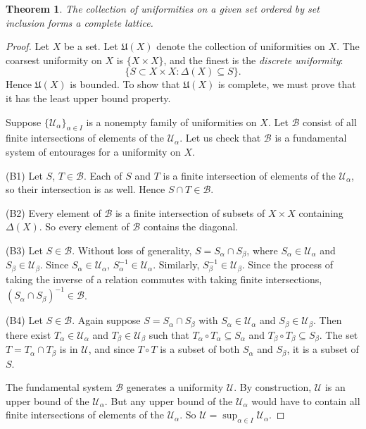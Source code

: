 \documentclass[12pt]{article}
\newtheorem*{theorem*}{Theorem}
\newcommand{\UU}{\mathcal{U}}
\newcommand{\BB}{\mathcal{B}}
\begin{document}
\begin{theorem*}
The collection of uniformities on a given set ordered by set inclusion forms a complete lattice.
\end{theorem*}

\begin{proof}
Let $X$ be a set.  Let $\mathfrak{U}(X)$ denote the collection of uniformities on $X$.  The coarsest uniformity on $X$ is $\{X\times X\}$, and the finest is the \emph{discrete uniformity}:
\[
\{S\subset X\times X\colon \Delta(X)\subseteq S\}.
\]
Hence $\mathfrak{U}(X)$ is bounded.  To show that $\mathfrak{U}(X)$ is complete, we must prove that it has the least upper bound property.  

Suppose $\{\UU_{\alpha}\}_{\alpha\in I}$ is a nonempty family of uniformities on $X$.  Let $\BB$ consist of all finite intersections of elements of the $\UU_{\alpha}$.  Let us check that $\BB$ is a fundamental system of entourages for a uniformity on $X$.

(B1) Let $S$, $T\in\BB$.  Each of $S$ and $T$ is a finite intersection of elements of the $\UU_{\alpha}$, so their intersection is as well.  Hence $S\cap T\in\BB$.

(B2) Every element of $\BB$ is a finite intersection of subsets of $X\times X$ containing $\Delta(X)$.  So every element of $\BB$ contains the diagonal.

(B3) Let $S\in\BB$.  Without loss of generality, $S=S_{\alpha}\cap S_{\beta}$, where $S_{\alpha}\in\UU_{\alpha}$ and $S_{\beta}\in\UU_{\beta}$.  Since $S_{\alpha}\in\UU_{\alpha}$, $S_{\alpha}^{-1}\in\UU_{\alpha}$.  Similarly, $S_{\beta}^{-1}\in\UU_{\beta}$.  Since the process of taking the inverse of a relation commutes with taking finite intersections, $(S_{\alpha}\cap S_{\beta})^{-1}\in\BB$.

(B4) Let $S\in\BB$.  Again suppose $S=S_{\alpha}\cap S_{\beta}$ with $S_{\alpha}\in\UU_{\alpha}$ and $S_{\beta}\in\UU_{\beta}$.  Then there exist $T_{\alpha}\in\UU_{\alpha}$ and $T_{\beta}\in\UU_{\beta}$ such that 
$T_{\alpha}\circ T_{\alpha}\subseteq S_{\alpha}$ and $T_{\beta}\circ T_{\beta}\subseteq S_{\beta}$.  The set $T=T_{\alpha}\cap T_{\beta}$ is in $\UU$, and since $T\circ T$ is a subset of both $S_{\alpha}$ and $S_{\beta}$, it is a subset of $S$.

The fundamental system $\BB$ generates a uniformity $\UU$.  By construction, $\UU$ is an upper bound of the $\UU_{\alpha}$.  But any upper bound of the $\UU_{\alpha}$ would have to contain all finite intersections of elements of the $\UU_{\alpha}$.  So $\UU=\sup_{\alpha\in I} \UU_{\alpha}$.
\end{proof}
\end{document}
